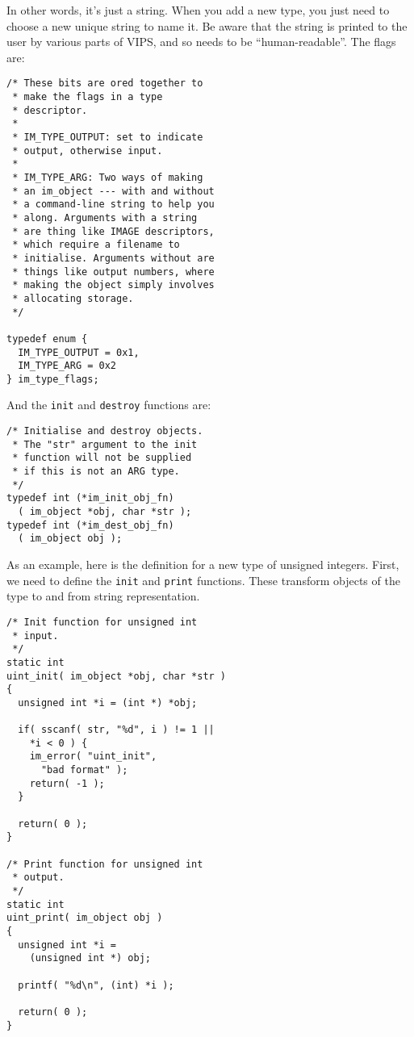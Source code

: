 In other words, it's just a string. When you add a new type, you just need
to choose a new unique string to name it. Be aware that the string is printed
to the user by various parts of VIPS, and so needs to be ``human-readable''.
The flags are:

\begin{verbatim}
/* These bits are ored together to 
 * make the flags in a type 
 * descriptor.
 *
 * IM_TYPE_OUTPUT: set to indicate 
 * output, otherwise input.
 *
 * IM_TYPE_ARG: Two ways of making 
 * an im_object --- with and without
 * a command-line string to help you 
 * along. Arguments with a string
 * are thing like IMAGE descriptors, 
 * which require a filename to 
 * initialise. Arguments without are 
 * things like output numbers, where 
 * making the object simply involves 
 * allocating storage.
 */

typedef enum {
  IM_TYPE_OUTPUT = 0x1,
  IM_TYPE_ARG = 0x2  
} im_type_flags;
\end{verbatim}

And the \verb+init+ and \verb+destroy+ functions are:

\begin{verbatim}
/* Initialise and destroy objects. 
 * The "str" argument to the init 
 * function will not be supplied 
 * if this is not an ARG type.
 */
typedef int (*im_init_obj_fn)
  ( im_object *obj, char *str );
typedef int (*im_dest_obj_fn)
  ( im_object obj );
\end{verbatim}

As an example, here is the definition for a new type of unsigned
integers. First, we need to define the \verb+init+ and \verb+print+
functions. These transform objects of the type to and from string
representation.

\begin{verbatim}
/* Init function for unsigned int 
 * input.
 */
static int
uint_init( im_object *obj, char *str )
{
  unsigned int *i = (int *) *obj;

  if( sscanf( str, "%d", i ) != 1 || 
    *i < 0 ) {
    im_error( "uint_init", 
      "bad format" );
    return( -1 );
  }

  return( 0 );
}

/* Print function for unsigned int 
 * output.
 */
static int
uint_print( im_object obj )
{
  unsigned int *i = 
    (unsigned int *) obj;

  printf( "%d\n", (int) *i );

  return( 0 );
}
\end{verbatim}

